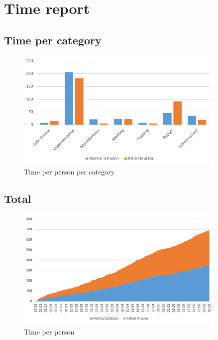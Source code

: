 \section{Time report}

\subsection{Time per category}
\begin{figure}[H]
	\centering
	\includegraphics[width=0.9\textwidth]{img/timereport_epics}
	\caption{Time per person per category}
	\label{fig:timereport_epics}
\end{figure}

\subsection{Total}
\begin{figure}[H]
	\centering
	\includegraphics[width=0.9\textwidth]{img/timereport_total}
	\caption{Time per person}
	\label{fig:timereport_total}
\end{figure}
